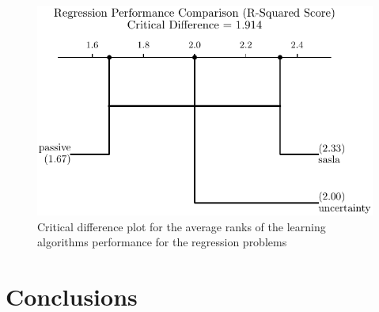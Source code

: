 \documentclass[conference]{IEEEtran}
\begin{document}
	\begin{figure}[htbp]
		\centering
		\includegraphics[width=\linewidth]{plots/regression_critical_difference.pdf}
		\caption{Critical difference plot for the average ranks of the learning algorithms performance for the regression problems}
		\label{fig:regression_cd}
	\end{figure}
	
	\section{Conclusions}\label{C}
\end{document}
